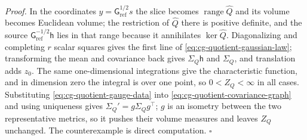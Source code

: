 \noindent\emph{Proof.}
In the coordinates \(y=\mathsf G_{\mathrm{ref}}^{1/2}s\) the slice becomes
\(\operatorname{range}\widehat Q\) and its volume becomes Euclidean volume; the
restriction of \(\widehat Q\) there is positive definite, and the source
\(\mathsf G_{\mathrm{ref}}^{-1/2}\mathsf h\) lies in that range because it
annihilates \(\ker\widehat Q\). Diagonalizing and completing \(r\) scalar squares
gives the first line of \eqref{eq:cg-quotient-gaussian-law}; transforming the
mean and covariance back gives \(\Sigma_Q\mathsf h\) and \(\Sigma_Q\), and
translation adds \(z_0\). The same one-dimensional integrations give the
characteristic function, and in dimension zero the integral is over one point,
so \(0<Z_Q<\infty\) in all cases. Substituting \eqref{eq:cg-quotient-gauge-data}
into \eqref{eq:cg-quotient-covariance-graph} and using uniqueness gives
\(\Sigma_Q'=g\Sigma_Qg^\top\); \(g\) is an isometry between the two representative
metrics, so it pushes their volume measures and leaves \(Z_Q\) unchanged. The
counterexample is direct computation. \(\square\)

